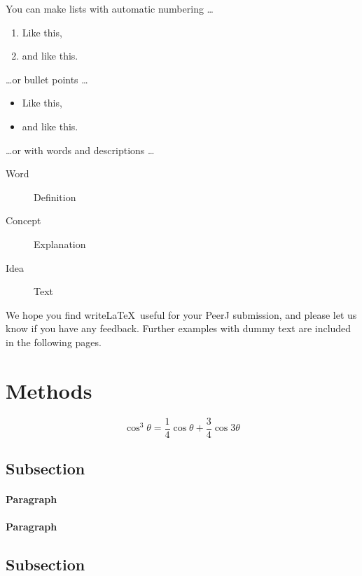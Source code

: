 \documentclass[fleqn,10pt,lineno]{wlpeerj} %
\begin{document}
You can make lists with automatic numbering \dots

\begin{enumerate}[noitemsep]
\item Like this,
\item and like this.
\end{enumerate}
\dots or bullet points \dots
\begin{itemize}[noitemsep]
\item Like this,
\item and like this.
\end{itemize}
\dots or with words and descriptions \dots
\begin{description}
\item[Word] Definition
\item[Concept] Explanation
\item[Idea] Text
\end{description}

We hope you find write\LaTeX\ useful for your PeerJ submission, and please let us know if you have any feedback. Further examples with dummy text are included in the following pages.

\section*{Methods}

\lipsum[4] %

\begin{equation}
\cos^3 \theta =\frac{1}{4}\cos\theta+\frac{3}{4}\cos 3\theta
\label{eq:refname2}
\end{equation}

\lipsum[5] %

\subsection*{Subsection}

\lipsum[6] %

\paragraph{Paragraph} \lipsum[7] %
\paragraph{Paragraph} \lipsum[8] %

\subsection*{Subsection}
\end{document}
